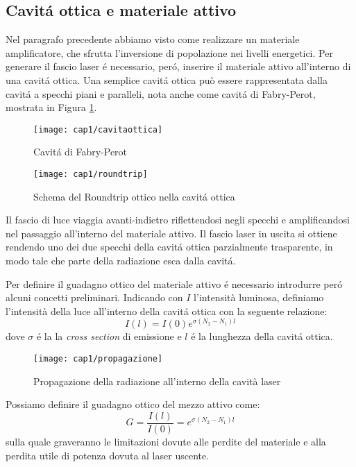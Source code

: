 \subsection{Cavit\'a ottica e materiale attivo}
Nel paragrafo precedente abbiamo visto come realizzare un materiale amplificatore, che sfrutta l'inversione di popolazione nei livelli energetici. Per generare il fascio laser \'e necessario, per\'o, inserire il materiale attivo all'interno di una cavit\'a ottica.
Una semplice cavit\'a ottica può essere rappresentata dalla cavit\'a a specchi piani e paralleli, nota anche come cavit\'a di Fabry-Perot, mostrata in Figura \ref{cavitaottica}. 
\begin{figure}[H]
	\begin{center}
		\texttt{[image: cap1/cavitaottica]}
		\caption{Cavit\'a di Fabry-Perot}
		\label{cavitaottica}
	\end{center}
\end{figure}
\begin{figure}[H]
  \begin{center}
    \texttt{[image: cap1/roundtrip]}
    \caption{Schema del Roundtrip ottico nella cavit\'a ottica}
    \label{roundtrip}
  \end{center}
\end{figure}
Il fascio di luce viaggia avanti-indietro riflettendosi negli specchi e amplificandosi nel passaggio all'interno del materiale attivo. Il fascio laser in uscita si ottiene rendendo uno dei due specchi della cavit\'a ottica parzialmente trasparente, in modo tale che parte della radiazione esca dalla cavit\'a.

Per definire il guadagno ottico del materiale attivo \'e necessario introdurre per\'o alcuni concetti preliminari. Indicando con $I$ l'intensità luminosa, definiamo l'intensità della luce all'interno della cavit\'a ottica con la seguente relazione:
\begin{equation}
I(l)=I(0)e^{\sigma(N_2-N_1)l}
\end{equation}
dove $\sigma$ \'e la la \textit{cross section} di emissione e $l$ \'e la lunghezza della cavit\'a ottica.

\begin{figure}[H]
  \begin{center}
    \texttt{[image: cap1/propagazione]}
    \caption{Propagazione della radiazione all'interno della cavità laser}
    \label{propagazione}
  \end{center}
\end{figure}
Possiamo definire il guadagno ottico del mezzo attivo come:
\begin{equation}
  G=\frac{I(l)}{I(0)}=e^{\sigma(N_2-N_1)l}
\end{equation}
sulla quale graveranno le limitazioni dovute alle perdite del materiale e alla perdita utile di potenza dovuta al laser uscente.

